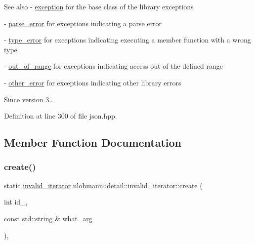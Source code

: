 \begin{DoxySeeAlso}{See also}
-\/ \mbox{\hyperlink{classnlohmann_1_1detail_1_1exception}{exception}} for the base class of the library exceptions 

-\/ \mbox{\hyperlink{classnlohmann_1_1detail_1_1parse__error}{parse\+\_\+error}} for exceptions indicating a parse error 

-\/ \mbox{\hyperlink{classnlohmann_1_1detail_1_1type__error}{type\+\_\+error}} for exceptions indicating executing a member function with a wrong type 

-\/ \mbox{\hyperlink{classnlohmann_1_1detail_1_1out__of__range}{out\+\_\+of\+\_\+range}} for exceptions indicating access out of the defined range 

-\/ \mbox{\hyperlink{classnlohmann_1_1detail_1_1other__error}{other\+\_\+error}} for exceptions indicating other library errors
\end{DoxySeeAlso}
\begin{DoxySince}{Since}
version 3.. 
\end{DoxySince}


Definition at line 300 of file json.\+hpp.



\subsection{Member Function Documentation}
\mbox{\label{classnlohmann_1_1detail_1_1invalid__iterator_a4e849260a3caa1b288c7e619130c6c09}} 
\subsubsection{\texorpdfstring{create()}{create()}}
{\footnotesize\ttfamily static \mbox{\hyperlink{classnlohmann_1_1detail_1_1invalid__iterator}{invalid\+\_\+iterator}} nlohmann\+::detail\+::invalid\+\_\+iterator\+::create (\begin{DoxyParamCaption}\item[{int}]{id\+\_\+,  }\item[{const \mbox{\hyperlink{namespacenlohmann_1_1detail_a1ed8fc6239da25abcaf681d30ace4985ab45cffe084dd3d20d928bee85e7b0f21}{std\+::string}} \&}]{what\+\_\+arg }\end{DoxyParamCaption})\hspace{0.3cm}{\ttfamily [inline]}, {\ttfamily [static]}}



